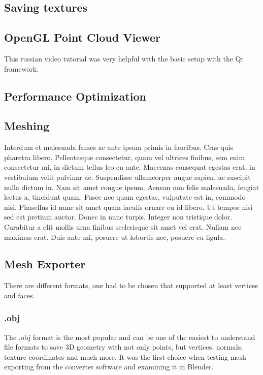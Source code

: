 \subsection{Saving textures}


\subsection{OpenGL Point Cloud Viewer}

This russian video tutorial was very helpful with the basic setup with the Qt framework.

\cite{ytQtOpenGL}

\subsection{Performance Optimization}


\subsection{Meshing}

Interdum et malesuada fames ac ante ipsum primis in faucibus. Cras quis pharetra libero. Pellentesque consectetur, quam vel ultrices finibus, sem enim consectetur mi, in dictum tellus leo eu ante. Maecenas consequat egestas erat, in vestibulum velit pulvinar ac. Suspendisse ullamcorper augue sapien, ac suscipit nulla dictum in. Nam sit amet congue ipsum. Aenean non felis malesuada, feugiat lectus a, tincidunt quam. Fusce nec quam egestas, vulputate est in, commodo nisi. Phasellus id nunc sit amet quam iaculis ornare eu id libero. Ut tempor nisi sed est pretium auctor. Donec in nunc turpis. Integer non tristique dolor. Curabitur a elit mollis urna finibus scelerisque sit amet vel erat. Nullam nec maximus erat. Duis ante mi, posuere ut lobortis nec, posuere eu ligula.



\subsection{Mesh Exporter}

There are different formats, one had to be chosen that supported at least vertices and faces.

\subsubsection{.obj}

The .obj format is the most popular and can be one of the easiest to understand file formats to save 3D geometry with not only points, but vertices, normals, texture coordinates and much more. It was the first choice when testing mesh exporting from the converter software and examining it in Blender.

